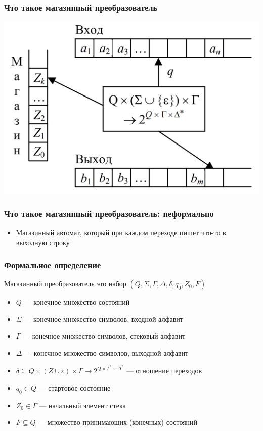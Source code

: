 \documentclass{beamer}
\begin{document}
\begin{frame}[fragile]
  \transwipe[direction=90]
  \frametitle{Что такое магазинный преобразователь}
\begin{center}
  \includegraphics[width=\textwidth]{pics/transducer.png}
\end{center} 

\end{frame}

\begin{frame}[fragile]
  \transwipe[direction=90]
  \frametitle{Что такое магазинный преобразователь: неформально}
\begin{itemize}
	\item Магазинный автомат, который при каждом переходе пишет что-то в выходную строку
\end{itemize}
\end{frame}


\begin{frame}[fragile]
  \transwipe[direction=90]
  \frametitle{Формальное определение}
  Магазинный преобразователь это набор $(Q, \Sigma, \Gamma, \Delta, \delta, q_0, Z_0, F)$
  \begin{itemize}
    \item $Q$ --- конечное множество состояний
    \item $\Sigma$ --- конечное множество символов, входной алфавит
    \item $\Gamma$ --- конечное множество символов, стековый алфавит
    \item $\Delta$ --- конечное множество символов, выходной алфавит
    \item $\delta \subseteq Q \times (Z \cup \varepsilon) \times \Gamma \rightarrow 2^{Q \times \Gamma^* \times \Delta^*}$ --- отношение переходов
    \item $q_0 \in Q$ --- стартовое состояние
    \item $Z_0 \in \Gamma$ --- начальный элемент стека
    \item $F \subseteq Q$ --- множество принимающих (конечных) состояний
  \end{itemize}
\end{frame}
\end{document}
